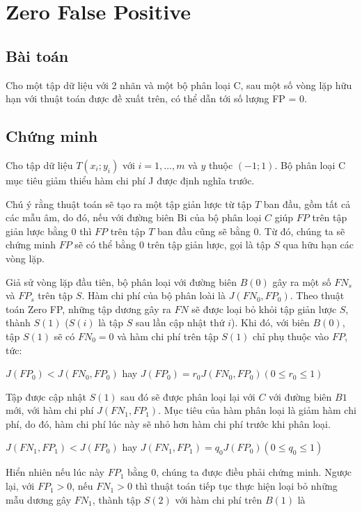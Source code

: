 \documentclass[./../main.tex]{subfiles}
\begin{document}
\section{Zero False Positive}
\subsection*{Bài toán}
Cho một tập dữ liệu với 2 nhãn và một bộ phân loại C, sau một số vòng lặp hữu hạn với thuật toán được đề xuất trên, có thể dẫn tới số lượng FP = 0.

\subsection*{Chứng minh}

Cho tập dữ liệu $T (x_i;y_i)$ với $i=1,\ldots,m$ và $y$ thuộc $(-1;1)$. Bộ phân loại C mục tiêu giảm thiểu hàm chi phí J được định nghĩa trước.


Chú ý rằng thuật toán sẽ tạo ra một tập giản lược từ tập $T$ ban đầu, gồm tất cả các mẫu âm, do đó, nếu với đường biên Bi của bộ phân loại $C$ giúp $FP$ trên tập giản lược bằng 0 thì $FP$ trên tập $T$ ban đầu cũng sẽ bằng 0. Từ đó, chúng ta sẽ chứng minh $FP$ sẽ có thể bằng $0$ trên tập giản lược, gọi là tập $S$ qua hữu hạn các vòng lặp.


Giả sử vòng lặp đầu tiên, bộ phân loại với đường biên $B(0)$ gây ra một số $FN_s$ và $FP_s$ trên tập $S$. Hàm chi phí của bộ phân loài là $J(FN_0,FP_0)$. Theo thuật toán Zero FP, những tập dương gây ra $FN $ sẽ được loại bỏ khỏi tập giản lược $S$, thành $S(1)$ ($S(i)$ là tập $S$ sau lần cập nhật thứ $i$). Khi đó, với biên $B(0)$, tập $S(1)$ sẽ có $FN_0 = 0$ và hàm chi phí trên tập $S(1)$ chỉ phụ thuộc vào $FP$, tức:

$J(FP_0) < J(FN_0, FP_0)$ hay $J(FP_0) = r_0 J(FN_0, FP_0) ( 0 \leq r_0 \leq 1)$

Tập được cập nhật $S(1)$ sau đó sẽ được phân loại lại với $C$ với đường biên $B1$ mới, với hàm chi phí $J(FN_1, FP_1)$. Mục tiêu của hàm phân loại là giảm hàm chi phí, do đó, hàm chi phí lúc này sẽ nhỏ hơn hàm chi phí trước khi phân loại.


$J(FN_1, FP_1) < J(FP_0)$ hay $J(FN_1, FP_1) = q_0 J(FP_0) (0 \leq q_0 \leq 1)$

Hiển nhiên nếu lúc này $FP_1$ bằng 0, chúng ta được điều phải chứng minh. Ngược lại, với $FP_1 >0$, nếu $FN_1 > 0$ thì thuật toán tiếp tục thực hiện loại bỏ những mẫu dương gây $FN_1$, thành tập $S(2)$ với hàm chi phí trên $B(1)$ là
\end{document}
